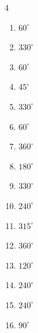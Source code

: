 \begin{multicols}{4}
\begin{enumerate}
  \item $\displaystyle 60^{\circ}$

  \item $\displaystyle 330^{\circ}$

  \item $\displaystyle 60^{\circ}$

  \item $\displaystyle 45^{\circ}$

  \item $\displaystyle 330^{\circ}$

  \item $\displaystyle 60^{\circ}$

  \item $\displaystyle 360^{\circ}$
        \phantom{$\displaystyle =2\pi$}

  \item $\displaystyle 180^{\circ}$
        \phantom{$\displaystyle =\pi$}

  \item $\displaystyle 330^{\circ}$

  \item $\displaystyle 240^{\circ}$

  \item $\displaystyle 315^{\circ}$

  \item $\displaystyle 360^{\circ}$
        \phantom{$\displaystyle =2\pi$}

  \item $\displaystyle 120^{\circ}$

  \item $\displaystyle 240^{\circ}$

  \item $\displaystyle 240^{\circ}$

  \item $\displaystyle 90^{\circ}$


\end{enumerate}
\end{multicols}
